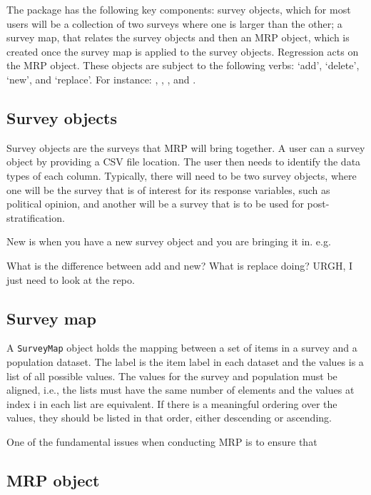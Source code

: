 \documentclass[
]{jss}
\begin{document}
The  package has the following key components: survey
objects, which for most users will be a collection of two surveys where
one is larger than the other; a survey map, that relates the survey
objects and then an MRP object, which is created once the survey map is
applied to the survey objects. Regression acts on the MRP object. These
objects are subject to the following verbs: `add', `delete', `new', and
`replace'. For instance: ,
, , and
.

\subsection*{Survey objects}

Survey objects are the surveys that MRP will bring together. A user can
 a survey object by providing a CSV file location. The
user then needs to identify the data types of each column. Typically,
there will need to be two survey objects, where one will be the survey
that is of interest for its response variables, such as political
opinion, and another will be a survey that is to be used for
post-stratification.

New is when you have a new survey object and you are bringing it in.
e.g.

What is the difference between add and new? What is replace doing? URGH,
I just need to look at the repo.

\subsection*{Survey map}

A \texttt{SurveyMap} object holds the mapping between a set of items in
a survey and a population dataset. The label is the item label in each
dataset and the values is a list of all possible values. The values for
the survey and population must be aligned, i.e., the lists must have the
same number of elements and the values at index i in each list are
equivalent. If there is a meaningful ordering over the values, they
should be listed in that order, either descending or ascending.

One of the fundamental issues when conducting MRP is to ensure that

\subsection*{MRP object}
\end{document}
